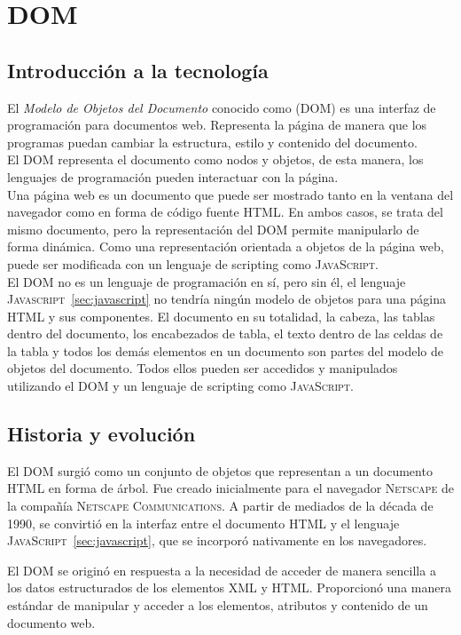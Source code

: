 \documentclass[a4paper, 11pt]{book}
\begin{document}
\section{DOM}
\label{sec:dom}
\subsection{Introducción a la tecnología}
El \emph{Modelo de Objetos del Documento} conocido como (\textsc{DOM}) es una interfaz de programación para documentos web. Representa la página de manera que los programas puedan cambiar la estructura, estilo y contenido del documento. \\
El \textsc{DOM} representa el documento como nodos y objetos, de esta manera, los lenguajes de programación pueden interactuar con la página.\\
Una página web es un documento que puede ser mostrado tanto en la ventana del navegador como en forma de código fuente \textsc{HTML}. En ambos casos, se trata del mismo documento, pero la representación del \textsc{DOM} permite manipularlo de forma dinámica. Como una representación orientada a objetos de la página web, puede ser modificada con un lenguaje de scripting como \textsc{JavaScript}.\\
El DOM no es un lenguaje de programación en sí, pero sin él, el lenguaje \textsc{Javascript}~\ref{sec:javascript} no tendría ningún modelo de objetos para una página HTML y sus componentes. El documento en su totalidad, la cabeza, las tablas dentro del documento, los encabezados de tabla, el texto dentro de las celdas de la tabla y todos los demás elementos en un documento son partes del modelo de objetos del documento. Todos ellos pueden ser accedidos y manipulados utilizando el DOM y un lenguaje de scripting como \textsc{JavaScript}.

\subsection{Historia y evolución}
El \textsc{DOM} surgió como un conjunto de objetos que representan a un documento \textsc{HTML} en forma de árbol. Fue creado inicialmente para el navegador \textsc{Netscape} de la compañía \textsc{Netscape Communications}. A partir de mediados de la década de 1990, se convirtió en la interfaz entre el documento \textsc{HTML} y el lenguaje \textsc{JavaScript}~\ref{sec:javascript}, que se incorporó nativamente en los navegadores.

El \textsc{DOM} se originó en respuesta a la necesidad de acceder de manera sencilla a los datos estructurados de los elementos \textsc{XML} y \textsc{HTML}. Proporcionó una manera estándar de manipular y acceder a los elementos, atributos y contenido de un documento web.
\end{document}

